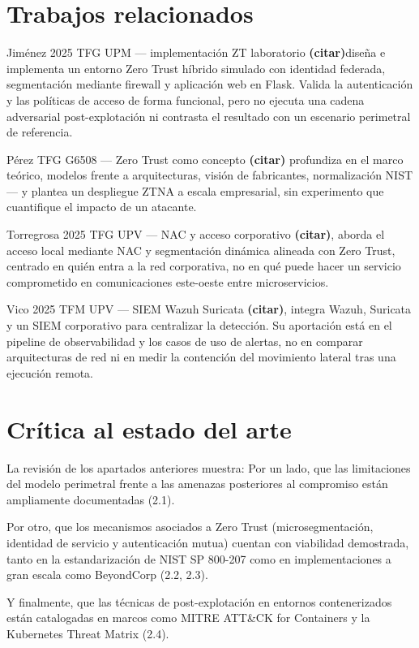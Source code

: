 \documentclass[11pt,spanish,listoffigures,listoftables]{tfgetsinf}
\begin{document}
    \section{Trabajos relacionados}
    Jiménez 2025 TFG UPM — implementación ZT laboratorio \textbf{(citar)}diseña e implementa un entorno Zero Trust híbrido simulado con identidad federada, segmentación mediante firewall y aplicación web en Flask. Valida la autenticación y las políticas de acceso de forma funcional, pero no ejecuta una cadena adversarial post-explotación ni contrasta el resultado con un escenario perimetral de referencia.
    
    Pérez TFG G6508 — Zero Trust como concepto \textbf{(citar)} profundiza en el marco teórico, modelos frente a arquitecturas, visión de fabricantes, normalización NIST— y plantea un despliegue ZTNA a escala empresarial, sin experimento que cuantifique el impacto de un atacante.
    
    Torregrosa 2025 TFG UPV — NAC y acceso corporativo \textbf{(citar)}, aborda el acceso local mediante NAC y segmentación dinámica alineada con Zero Trust, centrado en quién entra a la red corporativa, no en qué puede hacer un servicio comprometido en comunicaciones este-oeste entre microservicios. 
    
    Vico 2025 TFM UPV — SIEM Wazuh Suricata \textbf{(citar)}, integra Wazuh, Suricata y un SIEM corporativo para centralizar la detección. Su aportación está en el pipeline de observabilidad y los casos de uso de alertas, no en comparar arquitecturas de red ni en medir la contención del movimiento lateral tras una ejecución remota.
    
    \section{Crítica al estado del arte}
    La revisión de los apartados anteriores muestra: 
    Por un lado, que las limitaciones del modelo perimetral frente a las amenazas posteriores al compromiso están ampliamente documentadas (2.1).
    
    Por otro, que los mecanismos asociados a Zero Trust (microsegmentación, identidad de servicio y autenticación mutua) cuentan con viabilidad demostrada, tanto en la estandarización de NIST SP 800-207 como en implementaciones a gran escala como BeyondCorp (2.2, 2.3).
    
    Y finalmente, que las técnicas de post-explotación en entornos contenerizados están catalogadas en marcos como MITRE ATT\&CK for Containers y la Kubernetes Threat Matrix (2.4). 
    
\end{document}
